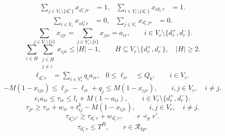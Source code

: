 \documentclass{setp-new}
\begin{document}
\begin{equation}
\begin{aligned}
\sum_{j\in V_r\setminus\{d_r^{+}\}}x_{d_r^{+}jr}&=1, &
\sum_{i\in V_r\setminus\{d_r^{-}\}}x_{id_r^{-}r}&=1 .
\end{aligned}
\label{eq:unified-trip-start-end}
\end{equation}
\begin{equation}
\begin{aligned}
\sum_{i\in V_r}x_{id_r^{+}r}&=0, &
\sum_{j\in V_r}x_{d_r^{-}jr}&=0 .
\end{aligned}
\label{eq:unified-trip-direction}
\end{equation}
\begin{equation}
\sum_{j\in V_r\setminus\{i\}}x_{ijr}
=\sum_{j\in V_r\setminus\{i\}}x_{jir}=a_{ir},
\qquad i\in V_r\setminus\{d_r^{+},d_r^{-}\}.
\label{eq:unified-flow}
\end{equation}
\begin{equation}
\sum_{i\in H}\sum_{\substack{j\in H\\j\ne i}}x_{ijr}
\le |H|-1,
\qquad H\subseteq V_r\setminus\{d_r^{+},d_r^{-}\},\quad |H|\ge2.
\label{eq:unified-subtour}
\end{equation}
\begin{equation}
\begin{aligned}
\ell_{d_r^{+}r}&=\sum_{i\in V_r^{c}}q_i a_{ir}, &
0\le\ell_{ir}&\le Q_k,\qquad i\in V_r .
\end{aligned}
\label{eq:unified-load-bound}
\end{equation}
\begin{equation}
-M(1-x_{ijr})
\le\ell_{jr}-\ell_{ir}+q_j
\le M(1-x_{ijr}),
\qquad i,j\in V_r,\quad i\ne j .
\label{eq:unified-load-propagation}
\end{equation}
\begin{equation}
e_i a_{ir}
\le\tau_{ir}\le l_i+M(1-a_{ir}),
\qquad i\in V_r\setminus\{d_r^{+},d_r^{-}\}.
\label{eq:unified-time-window}
\end{equation}
\begin{equation}
\tau_{jr}
\ge\tau_{ir}+w_{ir}+t_{ij}^{k}-M(1-x_{ijr}),
\qquad i,j\in V_r,\quad i\ne j .
\label{eq:unified-time-propagation}
\end{equation}
\begin{equation}
\tau_{d_{r'}^{+}r'}
\ge\tau_{d_r^{-}r}+w_{d_r^{-}r},
\qquad r\prec_p r' .
\label{eq:unified-trip-link-time}
\end{equation}
\begin{equation}
\tau_{d_r^{-}r}\le T^{H},
\qquad r\in\mathcal R_{kp}.
\label{eq:unified-horizon}
\end{equation}
\end{document}
